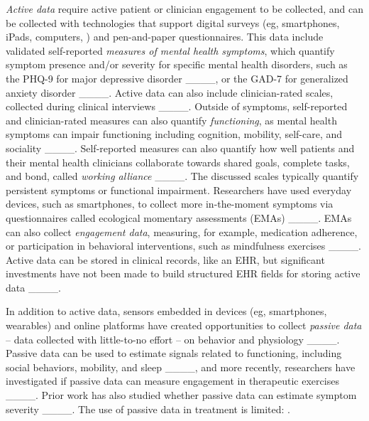 \textit{Active data} require active patient or clinician engagement to be collected, and can be collected with technologies that support digital surveys (eg, smartphones, iPads, computers, ) and pen-and-paper questionnaires.
This data include validated self-reported \textit{measures of mental health symptoms}, which quantify symptom presence and/or severity for specific mental health disorders, such as the PHQ-9 for major depressive disorder ____, or the GAD-7 for generalized anxiety disorder ____.
Active data can also include clinician-rated scales, collected during clinical interviews ____.
Outside of symptoms, self-reported and clinician-rated measures can also quantify \textit{functioning}, as mental health symptoms can impair functioning including cognition, mobility, self-care, and sociality ____. 
Self-reported measures can also quantify how well patients and their mental health clinicians collaborate towards shared goals, complete tasks, and bond, called \textit{working alliance} ____.
The discussed scales typically quantify persistent symptoms or functional impairment.
Researchers have used everyday devices, such as smartphones, to collect more in-the-moment symptoms via questionnaires called ecological momentary assessments (EMAs) ____.
EMAs can also collect \textit{engagement data}, measuring, for example, medication adherence, or participation in behavioral interventions, such as mindfulness exercises ____.
Active data can be stored in clinical records, like an EHR, but significant investments have not been made to build structured EHR fields for storing active data ____.

In addition to active data, sensors embedded in devices (eg, smartphones, wearables) and online platforms have created opportunities to collect \textit{passive data} -- data collected with little-to-no effort -- on behavior and physiology ____.
Passive data can be used to estimate signals related to functioning, including social behaviors, mobility, and sleep ____, and more recently, researchers have investigated if passive data can measure engagement in therapeutic exercises ____.
Prior work has also studied whether passive data can estimate symptom severity ____.
The use of passive data in treatment is limited: .

